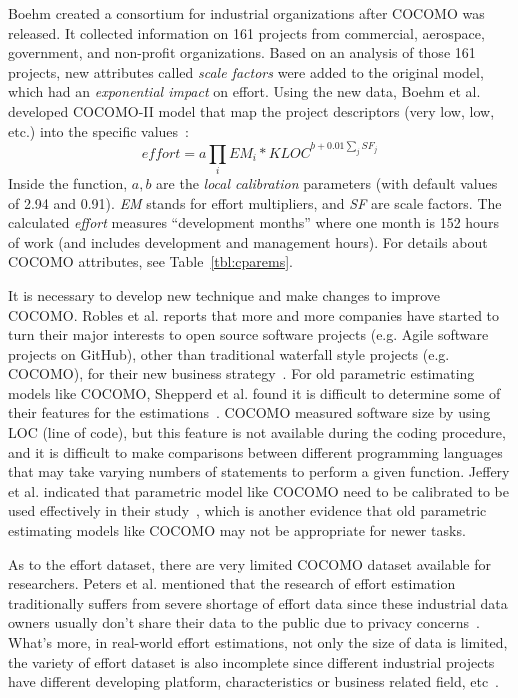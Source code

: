 \documentclass[sigconf,review]{acmart}
\newcommand{\tbl}[1]{Table~\ref{tbl:#1}}
\begin{document}
Boehm created a consortium for
industrial organizations after COCOMO was released.
It collected information on 161 projects from commercial,
aerospace, government, and non-profit organizations.
Based on an analysis of those 161 projects, new attributes called {\em scale factors} were added to the original model, which had an {\em exponential impact}
on effort.
Using the new data, Boehm et al. developed COCOMO-II model that map the project descriptors (very low, low, etc.)
into the specific values~\cite{boehm2000cost}:
\[
\mathit{effort}=a\prod_i EM_i *\mathit{KLOC}^{b+0.01\sum_j SF_j}
\]
Inside the function, $a,b$ are the {\em local calibration} parameters (with default values of 2.94 and 0.91). {\em EM} stands for effort multipliers, and {\em SF} are scale factors. The calculated {\em effort}
measures ``development months'' where one month is 152 hours of work  (and includes development and management hours). For details about COCOMO attributes, see \tbl{cparems}.

It is necessary to develop new technique and make changes to improve COCOMO. Robles et al. reports that more and more companies have started to turn their major interests to open source software projects (e.g. Agile software projects on GitHub), other than traditional waterfall style projects (e.g. COCOMO), for their new business strategy~\cite{robles2014estimating}. For old parametric estimating models like COCOMO, Shepperd et al. found it is difficult to determine some of their features for the estimations~\cite{shepperd2007software}. COCOMO measured software size by using LOC (line of code), but this feature is not available during the coding procedure, and it is difficult to make comparisons between different programming languages that may take varying numbers of statements to perform a given function. Jeffery et al. indicated that parametric model like COCOMO need to be calibrated to be used effectively in their study~\cite{jeffery1990calibrating}, which is another evidence that old parametric estimating models like COCOMO may not be appropriate for newer tasks. 

As to the effort dataset, there are very limited COCOMO dataset available for researchers. Peters et al. mentioned that the research of effort estimation traditionally suffers from severe shortage of effort data since these industrial data owners usually don't share their data to the public due to privacy concerns~\cite{peters2012privacy}. What's more, in real-world effort estimations, not only the size of data is limited, the variety of effort dataset is also incomplete since different industrial projects have different developing platform, characteristics or business related field, etc~\cite{qi2017software}.
\end{document}
